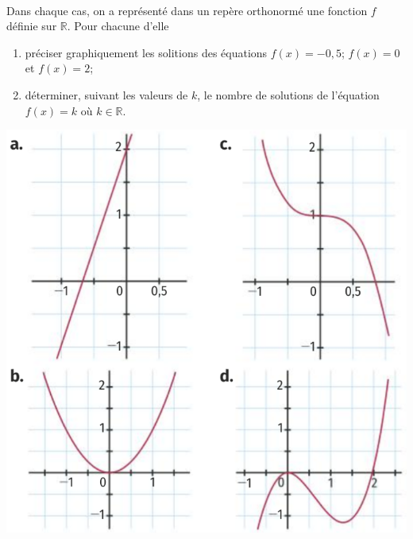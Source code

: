 \documentclass[11pt]{article}
\begin{document}
\begin{exo}~\\[-8mm]
\begin{minipage}{.5\textwidth}
  Dans chaque cas, on a représenté dans un repère orthonormé une fonction $f$
  définie sur $\mathbb{R}$. Pour chacune d'elle
  \begin{enumerate}
    \item préciser graphiquement les solitions des équations $f(x)=-0,5$;
      $f(x)=0$ et $f(x)=2$;
    \item déterminer, suivant les valeurs de $k$, le nombre de solutions de
      l'équation $f(x)=k$ où $k\in\mathbb{R}$.
  \end{enumerate}
\end{minipage}
\begin{minipage}{.5\textwidth}
  \begin{center}
    \includegraphics[scale=.3]{4fonctions.png}
  \end{center}
\end{minipage}
\end{exo}
\end{document}
